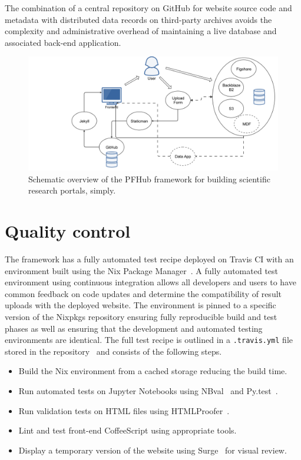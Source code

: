 \documentclass{jors}
\begin{document}
The combination of a central repository on GitHub for website source
code and metadata with distributed data records on third-party
archives avoids the complexity and administrative overhead of
maintaining a live database and associated back-end application.

\begin{figure}
  \includegraphics[width=\textwidth]{pfhub_website.png}
  \caption{Schematic overview of the PFHub framework for building
    scientific research portals, simply.}
  \centering
  \label{fig:pfhub_website}
\end{figure}

\section*{Quality control}

The framework has a fully automated test recipe deployed on Travis CI
with an environment built using the Nix Package Manager~\cite{nix}. A
fully automated test environment using continuous integration allows
all developers and users to have common feedback on code updates and
determine the compatibility of result uploads with the deployed
website. The environment is pinned to a specific version of the
Nixpkgs repository ensuring fully reproducible build and test phases
as well as ensuring that the development and automated testing
environments are identical. The full test recipe is outlined in a
\texttt{.travis.yml} file stored in the repository~\cite{travisyml}
and consists of the following steps.

\begin{itemize}
  \item Build the Nix environment from a cached storage reducing the
    build time.
  \item Run automated tests on Jupyter Notebooks using
    NBval~\cite{nbval} and Py.test~\cite{pytest}.
  \item Run validation tests on HTML files using
    HTMLProofer~\cite{htmlproofer}.
  \item Lint and test front-end CoffeeScript using appropriate tools.
  \item Display a temporary version of the website using
    Surge~\cite{surge} for visual review.
\end{itemize}
\end{document}
